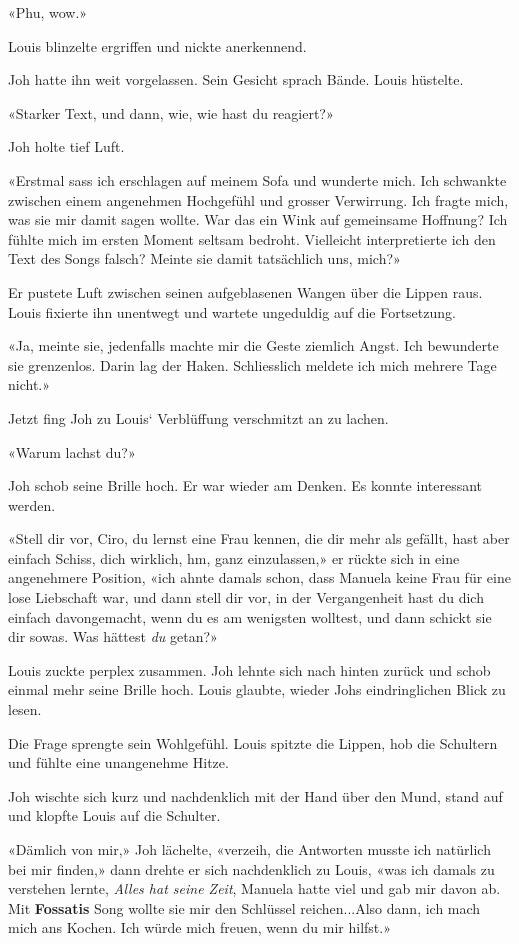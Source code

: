 «Phu, wow.»

Louis blinzelte ergriffen und nickte anerkennend.

Joh hatte ihn weit vorgelassen. Sein Gesicht sprach Bände. Louis
hüstelte.

«Starker Text, und dann, wie, wie hast du reagiert?»

Joh holte tief Luft.

«Erstmal sass ich erschlagen auf meinem Sofa und wunderte mich. Ich
schwankte zwischen einem angenehmen Hochgefühl und grosser Verwirrung.
Ich fragte mich, was sie mir damit sagen wollte. War das ein Wink auf
gemeinsame Hoffnung? Ich fühlte mich im ersten Moment seltsam bedroht.
Vielleicht interpretierte ich den Text des Songs falsch? Meinte sie
damit tatsächlich uns, mich?»

Er pustete Luft zwischen seinen aufgeblasenen Wangen über die Lippen
raus. Louis fixierte ihn unentwegt und wartete ungeduldig auf die
Fortsetzung.

«Ja, meinte sie, jedenfalls machte mir die Geste ziemlich Angst. Ich
bewunderte sie grenzenlos. Darin lag der Haken. Schliesslich meldete ich
mich mehrere Tage nicht.»

Jetzt fing Joh zu Louis` Verblüffung verschmitzt an zu lachen.

«Warum lachst du?»

Joh schob seine Brille hoch. Er war wieder am Denken. Es konnte
interessant werden.

«Stell dir vor, Ciro, du lernst eine Frau kennen, die dir mehr als
gefällt, hast aber einfach Schiss, dich wirklich, hm, ganz einzulassen,»
er rückte sich in eine angenehmere Position, «ich ahnte damals schon,
dass Manuela keine Frau für eine lose Liebschaft war, und dann stell dir
vor, in der Vergangenheit hast du dich einfach davongemacht, wenn du es
am wenigsten wolltest, und dann schickt sie dir sowas. Was hättest
\emph{du} getan?»

Louis zuckte perplex zusammen. Joh lehnte sich nach hinten zurück und
schob einmal mehr seine Brille hoch. Louis glaubte, wieder Johs
eindringlichen Blick zu lesen.

Die Frage sprengte sein Wohlgefühl. Louis spitzte die Lippen, hob die
Schultern und fühlte eine unangenehme Hitze.

Joh wischte sich kurz und nachdenklich mit der Hand über den Mund, stand
auf und klopfte Louis auf die Schulter.

«Dämlich von mir,» Joh lächelte, «verzeih, die Antworten musste ich
natürlich bei mir finden,» dann drehte er sich nachdenklich zu Louis,
«was ich damals zu verstehen lernte, \emph{Alles hat seine Zeit},
Manuela hatte viel und gab mir davon ab. Mit \textbf{Fossatis} Song
wollte sie mir den Schlüssel reichen...Also dann, ich mach mich ans
Kochen. Ich würde mich freuen, wenn du mir hilfst.»

